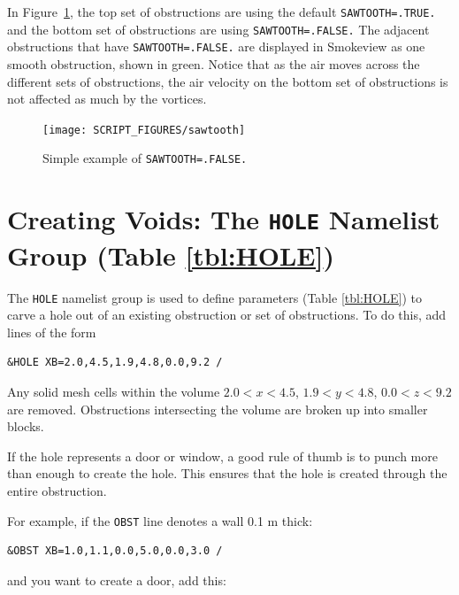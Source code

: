 \documentclass[11pt]{book}
\newcommand{\ct}{\tt\small}
\begin{document}
\noindent
In Figure~\ref{sawtooth}, the top set of obstructions are using the default {\ct SAWTOOTH=.TRUE.} and the bottom set of
obstructions are using {\ct SAWTOOTH=.FALSE.} The adjacent obstructions that have {\ct SAWTOOTH=.FALSE.} are displayed
in Smokeview as one smooth obstruction, shown in green. Notice that as the air moves across the different sets of obstructions,
the air velocity on the bottom set of obstructions is not affected as much by the vortices.

\begin{figure}[ht]
\begin{center}
\texttt{[image: SCRIPT\_FIGURES/sawtooth]}
\end{center}
\caption[Simple example of {\ct SAWTOOTH=.FALSE.}]{Simple example of {\ct SAWTOOTH=.FALSE.}}
\label{sawtooth}
\end{figure}


\newpage

\section{Creating Voids: The \texorpdfstring{{\tt HOLE}}{HOLE} Namelist Group (Table \ref{tbl:HOLE})}
\label{info:HOLE}

The {\ct HOLE} namelist group is used to define parameters (Table \ref{tbl:HOLE}) to carve a hole
out of an existing obstruction or set of obstructions. To do this, add lines of the form

\footnotesize
\begin{verbatim}
&HOLE XB=2.0,4.5,1.9,4.8,0.0,9.2 /
\end{verbatim}
\normalsize
Any solid mesh cells within the volume $2.0<x<4.5$, $1.9<y<4.8$,
$0.0<z<9.2$ are removed. Obstructions intersecting the volume are
broken up into smaller blocks.

\begin{notebox}
\noindent
If the hole represents a door or window, a good rule of thumb is to punch more than enough to create the hole.
This ensures that the hole is created through the entire obstruction.
\end{notebox}

\noindent
For example, if the {\ct OBST} line denotes a wall 0.1 m thick:

\footnotesize
\begin{verbatim}
&OBST XB=1.0,1.1,0.0,5.0,0.0,3.0 /
\end{verbatim}
\normalsize
and you want to create a door, add this:
\end{document}
